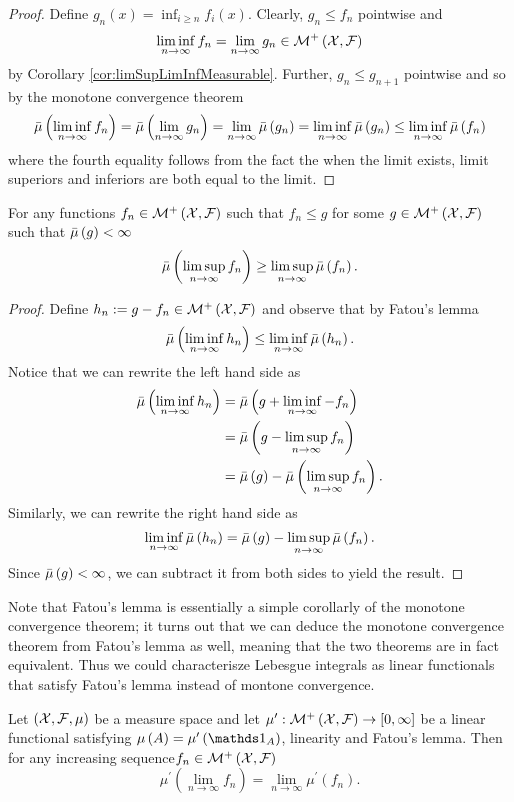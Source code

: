 \begin{proof}
Define $g_{n}\left(x\right)=\inf_{i\geq n}f_{i}\left(x\right).$ Clearly,
$g_{n}\leq f_{n}$ pointwise and
\[
\liminf_{n\to\infty}f_{n}=\lim_{n\to\infty}g_{n}\in\mathcal{M}^{+}\left(\mathcal{X},\mathcal{F}\right)
\]
by Corollary \ref{cor:limSupLimInfMeasurable}. Further, $g_{n}\leq g_{n+1}$
pointwise and so by the monotone convergence theorem
\[
\bar{\mu}\left(\liminf_{n\to\infty}f_{n}\right)=\bar{\mu}\left(\lim_{n\to\infty}g_{n}\right)=\lim_{n\to\infty}\bar{\mu}\left(g_{n}\right)=\liminf_{n\to\infty}\bar{\mu}\left(g_{n}\right)\leq\liminf_{n\to\infty}\bar{\mu}\left(f_{n}\right)
\]
where the fourth equality follows from the fact the when the limit
exists, limit superiors and inferiors are both equal to the limit.
\end{proof}
\begin{cor}
\label{cor:reverseFatouLemma}For any functions $f_{n}\in\mathcal{M}^{+}\left(\mathcal{X},\mathcal{F}\right)$
such that $f_{n}\leq g$ for some $g\in\mathcal{M}^{+}\left(\mathcal{X},\mathcal{F}\right)$
such that $\bar{\mu}\left(g\right)<\infty$
\[
\bar{\mu}\left(\limsup_{n\to\infty}f_{n}\right)\geq\limsup_{n\to\infty}\bar{\mu}\left(f_{n}\right).
\]
\end{cor}

\begin{proof}
Define $h_{n}:=g-f_{n}\in\mathcal{M}^{+}\left(\mathcal{X},\mathcal{F}\right)$ and observe
that by Fatou's lemma
\[
\bar{\mu}\left(\liminf_{n\to\infty}h_{n}\right)\leq\liminf_{n\to\infty}\bar{\mu}\left(h_{n}\right).
\]
Notice that we can rewrite the left hand side as 
\begin{align*}
\bar{\mu}\left(\liminf_{n\to\infty}h_{n}\right) & =\bar{\mu}\left(g+\liminf_{n\to\infty}-f_{n}\right)\\
 & =\bar{\mu}\left(g-\limsup_{n\to\infty}f_{n}\right)\\
 & =\bar{\mu}\left(g\right)-\bar{\mu}\left(\limsup_{n\to\infty}f_{n}\right).
\end{align*}
Similarly, we can rewrite the right hand side as 
\[
\liminf_{n\to\infty}\bar{\mu}\left(h_{n}\right)=\bar{\mu}\left(g\right)-\limsup_{n\to\infty}\bar{\mu}\left(f_{n}\right).
\]
Since $\bar{\mu}\left(g\right)<\infty$, we can subtract it from both sides
to yield the result.
\end{proof}
Note that Fatou's lemma is essentially a simple corollarly of the
monotone convergence theorem; it turns out that we can deduce the
monotone convergence theorem from Fatou's lemma as well, meaning that
the two theorems are in fact equivalent. Thus we could characterisze
Lebesgue integrals as linear functionals that satisfy Fatou's lemma
instead of montone convergence.
\begin{prop}
\label{prop:monotoneFromFatou}Let $\left(\mathcal{X},\mathcal{F},\mu\right)$ be a measure space
and let $\mu^{\prime}:\mathcal{M}^{+}\left(\mathcal{X},\mathcal{F}\right)\to\left[0,\infty\right]$
be a linear functional satisfying $\mu\left(A\right)=\mu^{\prime}\left(\indicate_{A}\right)$,
linearity and Fatou's lemma. Then for any increasing sequence$f_{n}\in\mathcal{M}^{+}\left(\mathcal{X},\mathcal{F}\right)$
\[
\mu^{\prime}\left(\lim_{n\to\infty}f_{n}\right)=\lim_{n\to\infty}\mu^{\prime}\left(f_{n}\right).
\]
\end{prop}

